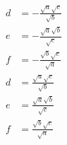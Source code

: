 \documentclass{article}
\begin{document}
\begin{align*}
d &= - \frac{\sqrt{a} \sqrt{c}}{\sqrt{b}} \\
e &= - \frac{\sqrt{a} \sqrt{b}}{\sqrt{c}} \\
f &= - \frac{\sqrt{b} \sqrt{c}}{\sqrt{a}} \\
d &= \frac{\sqrt{a} \sqrt{c}}{\sqrt{b}} \\
e &= \frac{\sqrt{a} \sqrt{b}}{\sqrt{c}} \\
f &= \frac{\sqrt{b} \sqrt{c}}{\sqrt{a}}
\end{align*}
\end{document}

